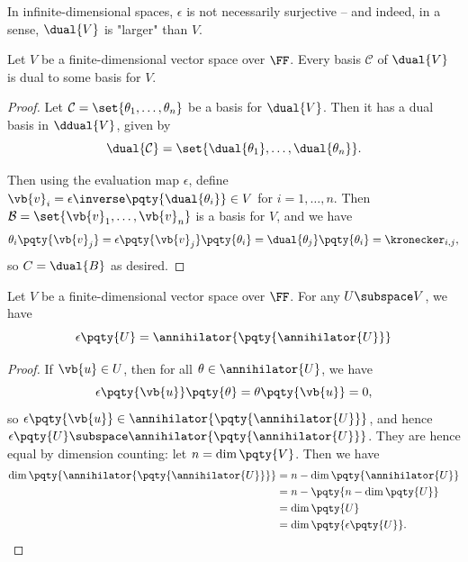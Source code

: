 \begin{remark}
    In infinite-dimensional spaces, \(\epsilon\) is not necessarily surjective -- and indeed, in a sense, \(\dual{V}\) is "larger" than \(V\).
\end{remark}

\begin{proposition}
    Let \(V\) be a finite-dimensional vector space over \(\FF\). Every basis \(\mathcal{C}\) of \(\dual{V}\) is dual to some basis for \(V\).
\end{proposition}

\begin{proof}
    Let \(\mathcal{C} = \set{\theta_1, \ldots, \theta_n}\) be a basis for \(\dual{V}\). Then it has a dual basis in \(\ddual{V}\), given by
    \[
        \dual{\mathcal{C}} = \set{\dual{\theta_1}, \ldots, \dual{\theta_n}}.
    \]

    Then using the evaluation map \(\epsilon\), define \(\vb{v}_i = \epsilon\inverse\pqty{\dual{\theta_i}} \in V\) for \(i = 1, \ldots, n\). Then \(\mathcal{B} = \set{\vb{v}_1, \ldots, \vb{v}_n}\) is a basis for \(V\), and we have
    \[
        \theta_i\pqty{\vb{v}_j} = \epsilon\pqty{\vb{v}_j} \pqty{\theta_i} = \dual{\theta_j}\pqty{\theta_i} = \kronecker_{i, j},
    \]
    so \(C = \dual{B}\) as desired.
\end{proof}

\begin{proposition}
    Let \(V\) be a finite-dimensional vector space over \(\FF\). For any \(U \subspace V\), we have
    \[
        \epsilon \pqty{U} = \annihilator{\pqty{\annihilator{U}}}
    \]
\end{proposition}

\begin{proof}
    If \(\vb{u} \in U\), then for all \(\theta \in \annihilator{U}\), we have
    \[
        \epsilon\pqty{\vb{u}}\pqty{\theta} = \theta\pqty{\vb{u}} = 0,
    \]
    so \(\epsilon\pqty{\vb{u}} \in \annihilator{\pqty{\annihilator{U}}}\), and hence \(\epsilon\pqty{U} \subspace \annihilator{\pqty{\annihilator{U}}}\). They are hence equal by dimension counting: let \(n = \dim\pqty{V}\). Then we have
    \begin{align*}
        \dim\pqty{\annihilator{\pqty{\annihilator{U}}}} &= n - \dim\pqty{\annihilator{U}} \\
        &= n - \pqty{n - \dim\pqty{U}} \\
        &= \dim\pqty{U} \\
        &= \dim\pqty{\epsilon\pqty{U}}.
    \end{align*}
\end{proof}

